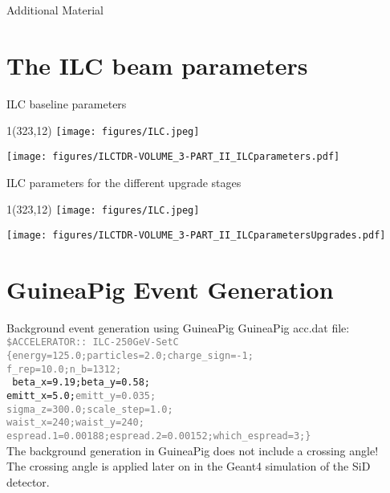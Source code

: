 \documentclass[xcolor={dvipsnames}]{beamer}
\newcommand{\ilclogo}{
  \setlength{\TPHorizModule}{1pt}
  \setlength{\TPVertModule}{1pt}
  \begin{textblock}{1}(323,12)
   \texttt{[image: figures/ILC.jpeg]}
  \end{textblock}
}
\begin{document}
\appendix

\begin{frame}
\begin{center}
\LARGE Additional Material
\end{center}
\end{frame}

\section{The ILC beam parameters}
\begin{frame}{ILC baseline parameters}
\ilclogo
\begin{center}
	\texttt{[image: figures/ILCTDR-VOLUME\_3-PART\_II\_ILCparameters.pdf]}
\end{center}
\end{frame}
\begin{frame}{ILC parameters for the different upgrade stages}
\ilclogo
\begin{center}
	\texttt{[image: figures/ILCTDR-VOLUME\_3-PART\_II\_ILCparametersUpgrades.pdf]}
\end{center}
\end{frame}

\section{GuineaPig Event Generation}
\begin{frame}{Background event generation using GuineaPig}
GuineaPig acc.dat file:\\
{\small\texttt{\textcolor{Gray}{\$ACCELERATOR:: ILC-250GeV-SetC \\                                                                            
\{energy=125.0;particles=2.0;charge\_sign=-1;\\
f\_rep=10.0;n\_b=1312;\\}
beta\_x=9.19;beta\_y=0.58;\\
emitt\_x=5.0;\textcolor{Gray}{emitt\_y=0.035;\\
sigma\_z=300.0;scale\_step=1.0;\\
waist\_x=240;waist\_y=240;\\
espread.1=0.00188;espread.2=0.00152;which\_espread=3;\}}
}}\\
\vspace*{0.3cm}
 The background generation in GuineaPig \alert{does not include a crossing angle}!\\
 The crossing angle is applied later on in the Geant4 simulation of the SiD detector.
\end{frame}
\end{document}
